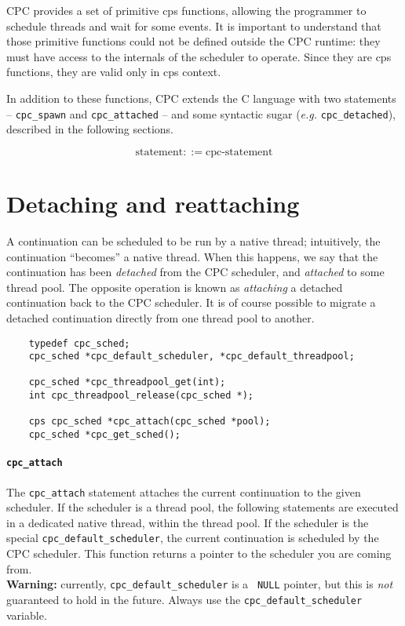 \documentclass[a4paper]{report}
\begin{document}
CPC provides a set of primitive cps functions, allowing the programmer
to schedule threads and wait for some events.  It is important to
understand that those primitive functions could not be defined outside
the CPC runtime: they must have access to the internals of the scheduler
to operate.  Since they are cps functions, they are valid only in cps
context.

In addition to these functions, CPC extends the C language with two
statements -- \texttt{cpc\_spawn} and \texttt{cpc\_attached} -- and some
syntactic sugar (\textit{e.g.} \texttt{cpc\_detached}), described in the
following sections.

\[ \mbox{statement} ::= \mbox{cpc-statement} \]

\section{Detaching and reattaching} \label{sec:native-threads}

A continuation can be scheduled to be run by a native thread; intuitively,
the continuation ``becomes'' a native thread.  When this happens, we say
that the continuation has been {\em detached\/} from the CPC scheduler,
and {\em attached\/} to some thread pool.  The opposite operation is
known as {\em attaching\/} a detached continuation back to the CPC
scheduler.  It is of course possible to migrate a detached continuation
directly from one thread pool to another.

\begin{verbatim}
    typedef cpc_sched;
    cpc_sched *cpc_default_scheduler, *cpc_default_threadpool;

    cpc_sched *cpc_threadpool_get(int);
    int cpc_threadpool_release(cpc_sched *);

    cps cpc_sched *cpc_attach(cpc_sched *pool);
    cpc_sched *cpc_get_sched();
\end{verbatim}


\paragraph{\tt cpc\_attach} The {\tt cpc\_attach} statement
attaches the current continuation to the given scheduler.  If the
scheduler is a thread pool, the following statements are executed in a
dedicated native thread, within the thread pool.  If the scheduler is
the special {\tt cpc\_default\_scheduler}, the current continuation is
scheduled by the CPC scheduler.  This function returns a pointer to the
scheduler you are coming from.\\
{\bf Warning:\/} currently, {\tt cpc\_default\_scheduler} is a {\tt
NULL} pointer, but this is {\em not\/} guaranteed to hold in the future.
Always use the {\tt cpc\_default\_scheduler} variable.
\end{document}
